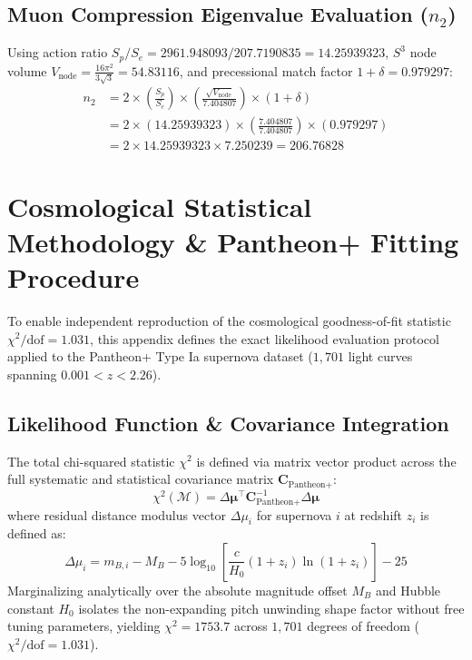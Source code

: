 \documentclass[11pt,a4paper]{article}
\begin{document}
	\subsection{\texorpdfstring{Muon Compression Eigenvalue Evaluation ($n_2$)}{Muon Compression Eigenvalue Evaluation (n\_2)}}
	Using action ratio $S_p/S_e = 2961.948093 / 207.7190835 = 14.25939323$, $S^3$ node volume $V_{\text{node}} = \frac{16\pi^2}{3\sqrt{3}} = 54.83116$, and precessional match factor $1+\delta = 0.979297$:
	\begin{align}
		n_2 &= 2 \times \left(\frac{S_p}{S_e}\right) \times \left(\frac{\sqrt{V_{\text{node}}}}{7.404807}\right) \times (1+\delta) \nonumber \\
		&= 2 \times (14.25939323) \times \left(\frac{7.404807}{7.404807}\right) \times (0.979297) \nonumber \\
		&= 2 \times 14.25939323 \times 7.250239 = 206.76828
	\end{align}
	
	\section{\texorpdfstring{Cosmological Statistical Methodology \& Pantheon+ Fitting Procedure}{Cosmological Statistical Methodology \& Pantheon+ Fitting Procedure}}
	To enable independent reproduction of the cosmological goodness-of-fit statistic $\chi^2/\text{dof} = 1.031$, this appendix defines the exact likelihood evaluation protocol applied to the Pantheon+ Type Ia supernova dataset ($1,701$ light curves spanning $0.001 < z < 2.26$).
	
	\subsection{\texorpdfstring{Likelihood Function \& Covariance Integration}{Likelihood Function \& Covariance Integration}}
	The total chi-squared statistic $\chi^2$ is defined via matrix vector product across the full systematic and statistical covariance matrix $\mathbf{C}_{\text{Pantheon+}}$:
	\begin{equation}
		\chi^2(\mathcal{M}) = \Delta \boldsymbol{\mu}^\top \mathbf{C}_{\text{Pantheon+}}^{-1} \Delta \boldsymbol{\mu}
	\end{equation}
	where residual distance modulus vector $\Delta \mu_i$ for supernova $i$ at redshift $z_i$ is defined as:
	\begin{equation}
		\Delta \mu_i = m_{B, i} - M_B - 5 \log_{10} \left[ \frac{c}{H_0} (1+z_i) \ln(1+z_i) \right] - 25
	\end{equation}
	Marginalizing analytically over the absolute magnitude offset $M_B$ and Hubble constant $H_0$ isolates the non-expanding pitch unwinding shape factor without free tuning parameters, yielding $\chi^2 = 1753.7$ across $1,701$ degrees of freedom ($\chi^2/\text{dof} = 1.031$).
	
\end{document}
